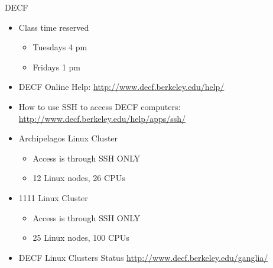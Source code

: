 \documentclass[xcolor=x11names,compress]{beamer}
\renewcommand{\(}{\begin{columns}}
\renewcommand{\)}{\end{columns}}
\newcommand{\<}[1]{\begin{column}{#1}}
\renewcommand{\>}{\end{column}}
\begin{document}
\begin{frame}{DECF}

\begin{itemize}
\item Class time reserved 
  \begin{itemize}
  \item Tuesdays 4 pm
  \item Fridays 1 pm
  \end{itemize}

\item DECF Online Help: \href{http://www.decf.berkeley.edu/help/}{http://www.decf.berkeley.edu/help/}	

\item How to use SSH to access DECF computers: \href{http://www.decf.berkeley.edu/help/apps/ssh/}{http://www.decf.berkeley.edu/help/apps/ssh/}

\item Archipelagos Linux Cluster	
  \begin{itemize}
  \item Access is through SSH ONLY	
  \item 12 Linux nodes, 26 CPUs
  \end{itemize}

\item 1111 Linux Cluster		
  \begin{itemize}
  \item Access is through SSH ONLY
  \item 25 Linux nodes, 100 CPUs
  \end{itemize}

\item DECF Linux Clusters Status \href{http://www.decf.berkeley.edu/ganglia/}{http://www.decf.berkeley.edu/ganglia/}

\end{itemize}

\end{frame}
\end{document}
